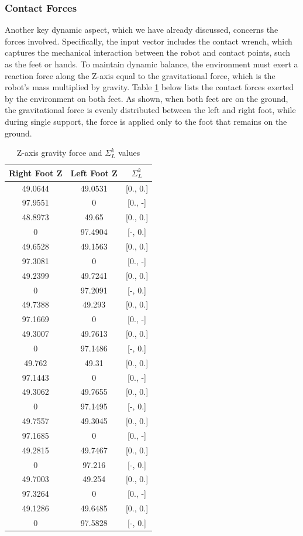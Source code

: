 \documentclass[main.tex]{subfiles}
\begin{document}
\subsubsection*{Contact Forces}
Another key dynamic aspect, which we have already discussed, concerns the forces involved. Specifically, the input vector includes the contact wrench, which captures the mechanical interaction between the robot and contact points, such as the feet or hands. To maintain dynamic balance, the environment must exert a reaction force along the Z-axis equal to the gravitational force, which is the robot's mass multiplied by gravity. Table \ref{tab:contact_forces_walking} below lists the contact forces exerted by the environment on both feet. As shown, when both feet are on the ground, the gravitational force is evenly distributed between the left and right foot, while during single support, the force is applied only to the foot that remains on the ground.\begin{table}[H]
\label{tab:contact_forces_walking}
\centering
\begin{tabular}{ccc}
\toprule
Right Foot Z & Left Foot Z & $\Sigma_L^k$ \\
\midrule
49.0644 & 49.0531 & [0., 0.] \\
97.9551 & 0 & [0., -] \\
48.8973 & 49.65 & [0., 0.] \\
0 & 97.4904 & [-, 0.] \\
49.6528 & 49.1563 & [0., 0.] \\
97.3081 & 0 & [0., -] \\
49.2399 & 49.7241 & [0., 0.] \\
0 & 97.2091 & [-, 0.] \\
49.7388 & 49.293 & [0., 0.] \\
97.1669 & 0 & [0., -] \\
49.3007 & 49.7613 & [0., 0.] \\
0 & 97.1486 & [-, 0.] \\
49.762 & 49.31 & [0., 0.] \\
97.1443 & 0 & [0., -] \\
49.3062 & 49.7655 & [0., 0.] \\
0 & 97.1495 & [-, 0.] \\
49.7557 & 49.3045 & [0., 0.] \\
97.1685 & 0 & [0., -] \\
49.2815 & 49.7467 & [0., 0.] \\
0 & 97.216 & [-, 0.] \\
49.7003 & 49.254 & [0., 0.] \\
97.3264 & 0 & [0., -] \\
49.1286 & 49.6485 & [0., 0.] \\
0 & 97.5828 & [-, 0.] \\
\bottomrule
\end{tabular}
\caption{Z-axis gravity force and $\Sigma_L^k$ values}
\end{table}
\end{document}
